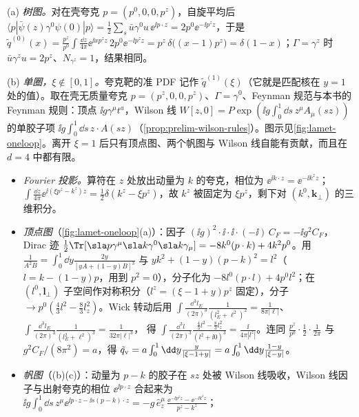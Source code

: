 \begin{example}\label{ex:lattice-quasi-tree}
(a) \emph{树图。}对在壳夸克 $p=(p^0,0,0,p^z)$，自旋平均后 $\langle p|\bar\psi(z)\gamma^0\psi(0)|p\rangle=\frac12\sum_s\bar u\gamma^0u\,\ee^{\ii p\cdot z}=2p^0\ee^{-\ii p^zz}$，于是
$\tilde q^{(0)}(x)=\frac{p^z}{p^0}\int\frac{\dd z}{4\pi}\ee^{\ii xp^zz}\,2p^0\ee^{-\ii p^zz}=p^z\,\delta\big((x-1)p^z\big)=\delta(1-x)$；$\Gamma=\gamma^z$ 时 $\bar u\gamma^zu=2p^z$、$N_{\gamma^z}=1$，结果相同。

(b) \emph{单圈，$\xi\notin[0,1]$。}夸克靶的准 PDF 记作 $\tilde q^{(1)}(\xi)$（它就是匹配核在 $y=1$ 处的值）。取在壳无质量夸克 $p=(p^z,0,0,p^z)$、$\Gamma=\gamma^0$、Feynman 规范与本书的 Feynman 规则：顶点 $\ii g\gamma^\mu t^a$，Wilson 线 $W[z,0]=P\exp(\ii g\int_0^1\dd s\,z^\mu A_\mu(sz))$ 的单胶子项 $\ii g\int_0^1\dd s\,z\cdot A(sz)$（\cref{prop:prelim-wilson-rules}）。图示见\cref{fig:lamet-oneloop}。离开 $\xi=1$ 后只有顶点图、两个帆图与 Wilson 线自能有贡献，而且在 $d=4$ 中都有限。
\begin{itemize}[leftmargin=1.5em,itemsep=1pt,topsep=2pt]
\item \emph{Fourier 投影。}算符在 $z$ 处放出动量为 $k$ 的夸克，相位为 $\ee^{\ii k\cdot z}=\ee^{-\ii k^zz}$；$\int\frac{\dd z}{4\pi}\ee^{\ii(\xi p^z-k^z)z}=\frac12\delta(k^z-\xi p^z)$，故 $k^z$ 被固定为 $\xi p^z$，剩下对 $(k^0,\mathbf k_\perp)$ 的三维积分。
\item \emph{顶点图}（\cref{fig:lamet-oneloop}(a)）：因子 $(\ii g)^2\cdot\ii\cdot\ii\cdot(-\ii)\,C_F=-\ii g^2C_F$，Dirac 迹 $\frac12\Tr[\sla p\gamma^\mu\sla k\gamma^0\sla k\gamma_\mu]=-8k^0(p\cdot k)+4k^2p^0$。用 $\frac1{A^2B}=\int_0^1\dd y\frac{2y}{[yA+(1-y)B]^3}$ 与 $yk^2+(1-y)(p-k)^2=l^2$（$l=k-(1-y)p$，用到 $p^2=0$），分子化为 $-8l^0(p\cdot l)+4p^0l^2$；在 $(l^0,\mathbf l_\perp)$ 子空间作对称积分（$l^z=(\xi-1+y)p^z$ 固定），分子 $\to p^0(\frac43l^2-\frac83l_z^2)$。Wick 转动后用
$\int\frac{\dd^3l_E}{(2\pi)^3}\frac1{(l_E^2+\ell^2)^2}=\frac1{8\pi|\ell|}$、$\int\frac{\dd^3l_E}{(2\pi)^3}\frac1{(l_E^2+\ell^2)^3}=\frac1{32\pi|\ell|^3}$，
得 $\int\frac{\dd^3l}{(2\pi)^3}\frac{\frac43l^2-\frac83l_z^2}{(l^2+\ii0)^3}=\frac{\ii}{4\pi|l^z|}$。连同 $\frac{p^z}{p^0}\cdot\frac12\cdot\frac1{2\pi}$ 与 $g^2C_F/(8\pi^2)=a$，得 $\tilde q_{\rm v}=a\int_0^1\dd y\frac{y}{|\xi-1+y|}=a\int_0^1\dd y\frac{1-y}{|\xi-y|}$。
\item \emph{帆图}（(b)(c)）：动量为 $p-k$ 的胶子在 $sz$ 处被 Wilson 线吸收，Wilson 线因子与出射夸克的相位 $\ee^{\ii p\cdot z}$ 合起来为
$\ii g\int_0^1\dd s\,z^\mu\ee^{\ii p\cdot z-\ii s(p-k)\cdot z}=-g\,\hat e_z^\mu\,\frac{\ee^{-\ii p^zz}-\ee^{-\ii k^zz}}{p^z-k^z}$；

\end{itemize}
\end{example}
